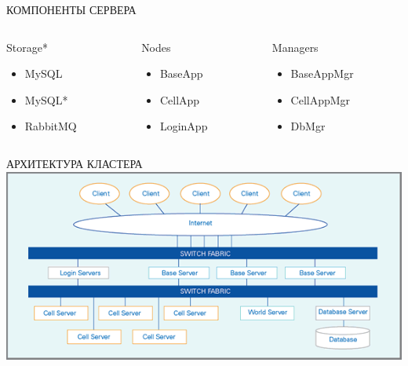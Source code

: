 \documentclass[aspectratio=169]{beamer}
\begin{document}
\begin{frame}{КОМПОНЕНТЫ СЕРВЕРА}
    \begin{columns}

    \begin{column}{0.33\textwidth}
    \begin{block}{Storage*}
        \begin{itemize}
            \item MySQL
            \item MySQL*
            \item RabbitMQ
        \end{itemize}
    \end{block}
    \end{column}

    \begin{column}{0.33\textwidth}
    \begin{block}{Nodes}
        \begin{itemize}
            \item BaseApp
            \item CellApp
            \item LoginApp
        \end{itemize}
    \end{block}
    \end{column}

    \begin{column}{0.33\textwidth}
    \begin{block}{Managers}
        \begin{itemize}
            \item BaseAppMgr
            \item CellAppMgr
            \item DbMgr
        \end{itemize}
    \end{block}
    \end{column}

    \end{columns}
    \vspace*{1cm}
\end{frame}

{
\logo{}
\begin{frame}{АРХИТЕКТУРА КЛАСТЕРА}
\includegraphics[width=0.90\paperwidth]{server.png}
\end{frame}
}
\end{document}
